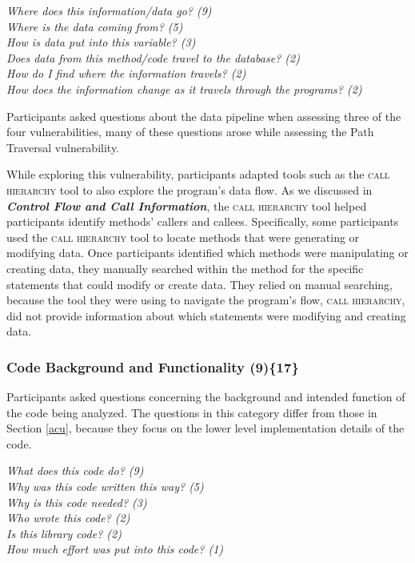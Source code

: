 \documentclass{acm_proc_article-sp}
\begin{document}
\noindent\emph{Where does this information/data go? (9)} \\
\emph{Where is the data coming from? (5)} \\
\emph{How is data put into this variable? (3)} \\
\emph{Does data from this method/code travel to the database? (2)} \\
\emph{How do I find where the information travels? (2)} \\
\emph{How does the information change as it travels through the programs? (2)} 


 
Participants asked questions about the data pipeline when assessing three of the four vulnerabilities, many of these questions arose while assessing the Path Traversal vulnerability. 

While exploring this vulnerability, participants adapted tools such as the \textsc{call hierarchy} tool to also explore the program's data flow. 
As we discussed in \emph{\textbf{Control Flow and Call Information}}, the \textsc{call hierarchy} tool helped participants identify methods' callers and callees.
Specifically, some participants used the \textsc{call hierarchy} tool to locate methods that were generating or modifying data.
Once participants identified which methods were manipulating or creating data, they manually searched within the method for the specific statements that could modify or create data.
They relied on manual searching, because the tool they were using to navigate the program's flow, \textsc{call hierarchy}, did not provide information about which statements were modifying and creating data.



\subsubsection{\textbf{Code Background and Functionality (9)\{17\}}}
\label{cbf}
Participants asked questions concerning the background and intended function of the code being analyzed. 
The questions in this category differ from those in Section \ref{acu}, because they focus on the lower level implementation details of the code.

\noindent\emph{What does this code do? (9)} \\
\emph{Why was this code written this way? (5)} \\
\emph{Why is this code needed? (3)} \\
\emph{Who wrote this code? (2)} \\
\emph{Is this library code? (2)} \\
\emph{How much effort was put into this code? (1)}
\end{document}
